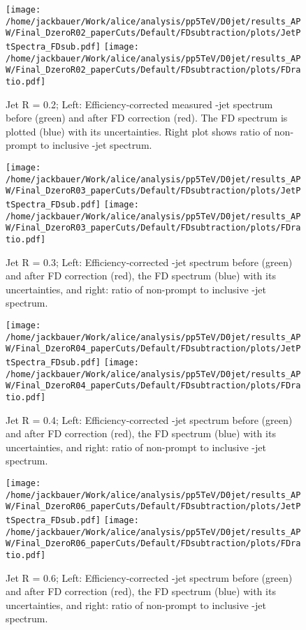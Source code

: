 \begin{figure}[bth]
\centering
\texttt{[image: /home/jackbauer/Work/alice/analysis/pp5TeV/D0jet/results\_APW/Final\_DzeroR02\_paperCuts/Default/FDsubtraction/plots/JetPtSpectra\_FDsub.pdf]}
\texttt{[image: /home/jackbauer/Work/alice/analysis/pp5TeV/D0jet/results\_APW/Final\_DzeroR02\_paperCuts/Default/FDsubtraction/plots/FDratio.pdf]}
\caption{Jet R = 0.2; Left: Efficiency-corrected measured \Dzero-jet spectrum before (green) and after FD correction (red). The FD spectrum is plotted (blue) with its uncertainties. Right plot shows ratio of non-prompt to inclusive \Dzero-jet spectrum.}
\label{fig:ppFD_corr_DzeroR02}
\end{figure}

\begin{figure}[bth]
\centering
\texttt{[image: /home/jackbauer/Work/alice/analysis/pp5TeV/D0jet/results\_APW/Final\_DzeroR03\_paperCuts/Default/FDsubtraction/plots/JetPtSpectra\_FDsub.pdf]}
\texttt{[image: /home/jackbauer/Work/alice/analysis/pp5TeV/D0jet/results\_APW/Final\_DzeroR03\_paperCuts/Default/FDsubtraction/plots/FDratio.pdf]}
\caption{Jet R = 0.3; Left: Efficiency-corrected \Dzero-jet spectrum before (green) and after FD correction (red), the FD spectrum (blue) with its uncertainties, and right: ratio of non-prompt to inclusive \Dzero-jet spectrum.}
\label{fig:ppFD_corr_DzeroR03}
\end{figure}

\begin{figure}[bth]
\centering
\texttt{[image: /home/jackbauer/Work/alice/analysis/pp5TeV/D0jet/results\_APW/Final\_DzeroR04\_paperCuts/Default/FDsubtraction/plots/JetPtSpectra\_FDsub.pdf]}
\texttt{[image: /home/jackbauer/Work/alice/analysis/pp5TeV/D0jet/results\_APW/Final\_DzeroR04\_paperCuts/Default/FDsubtraction/plots/FDratio.pdf]}
\caption{Jet R = 0.4; Left: Efficiency-corrected \Dzero-jet spectrum before (green) and after FD correction (red), the FD spectrum (blue) with its uncertainties, and right: ratio of non-prompt to inclusive \Dzero-jet spectrum.}
\label{fig:ppFD_corr_DzeroR04}
\end{figure}

\begin{figure}[bth]
\centering
\texttt{[image: /home/jackbauer/Work/alice/analysis/pp5TeV/D0jet/results\_APW/Final\_DzeroR06\_paperCuts/Default/FDsubtraction/plots/JetPtSpectra\_FDsub.pdf]}
\texttt{[image: /home/jackbauer/Work/alice/analysis/pp5TeV/D0jet/results\_APW/Final\_DzeroR06\_paperCuts/Default/FDsubtraction/plots/FDratio.pdf]}
\caption{Jet R = 0.6; Left: Efficiency-corrected \Dzero-jet spectrum before (green) and after FD correction (red), the FD spectrum (blue) with its uncertainties, and right: ratio of non-prompt to inclusive \Dzero-jet spectrum.}
\label{fig:ppFD_corr_DzeroR06}
\end{figure}


